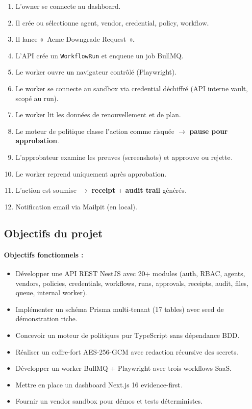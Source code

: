 \begin{enumerate}[leftmargin=1.8cm, itemsep=3pt]
  \item L'owner se connecte au dashboard.
  \item Il crée ou sélectionne agent, vendor, credential, policy, workflow.
  \item Il lance «~Acme Downgrade Request~».
  \item L'API crée un \texttt{WorkflowRun} et enqueue un job BullMQ.
  \item Le worker ouvre un navigateur contrôlé (Playwright).
  \item Le worker se connecte au sandbox via credential déchiffré (API
    interne vault, scopé au run).
  \item Le worker lit les données de renouvellement et de plan.
  \item Le moteur de politique classe l'action comme risquée
    $\rightarrow$ \textbf{pause pour approbation}.
  \item L'approbateur examine les preuves (screenshots) et approuve ou
    rejette.
  \item Le worker reprend uniquement après approbation.
  \item L'action est soumise $\rightarrow$ \textbf{receipt} + \textbf{audit
    trail} générés.
  \item Notification email via Mailpit (en local).
\end{enumerate}

\subsection{Objectifs du projet}

\paragraph{Objectifs fonctionnels :}
\begin{itemize}[leftmargin=1.8cm, itemsep=3pt]
  \item Développer une API REST NestJS avec 20+ modules (auth, RBAC,
    agents, vendors, policies, credentials, workflows, runs, approvals,
    receipts, audit, files, queue, internal worker).
  \item Implémenter un schéma Prisma multi-tenant (17 tables) avec seed
    de démonstration riche.
  \item Concevoir un moteur de politiques pur TypeScript sans dépendance
    BDD.
  \item Réaliser un coffre-fort AES-256-GCM avec redaction récursive des
    secrets.
  \item Développer un worker BullMQ + Playwright avec trois workflows
    SaaS.
  \item Mettre en place un dashboard Next.js 16 evidence-first.
  \item Fournir un vendor sandbox pour démos et tests déterministes.
\end{itemize}

